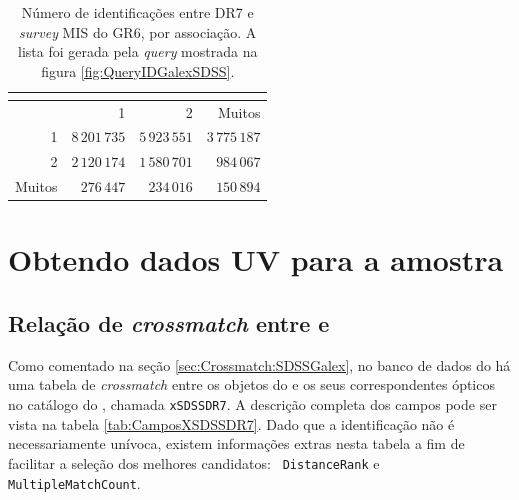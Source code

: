 \begin{table}
	\caption[Identificações entre \SDSS DR7 e {\em survey} AIS do \galex GR6.]
	{Número de identificações entre \SDSS DR7 e {\em survey} MIS do \galex GR6, por
	associação. A lista foi gerada pela {\em query} mostrada na figura
	\ref{fig:QueryIDGalexSDSS}.}
	\setlength{\tabcolsep}{1cm}
	\begin{tabular}{r r r r}
		\galex &         \multicolumn{3}{c}{\SDSS} \\
		\midrule
		       &             1 &             2 &        Muitos \\
		1      & $8\,201\,735$ & $5\,923\,551$ & $3\,775\,187$ \\
		2      & $2\,120\,174$ & $1\,580\,701$ &    $984\,067$ \\
		Muitos &    $276\,447$ &    $234\,016$ &    $150\,894$ \\
	\end{tabular}
	\label{tab:SDSSxGalexMatchesMIS}
\end{table}



\section{Obtendo dados UV para a amostra \STARLIGHT}
\label{sec:Crossmatch:DefAmostras}

\subsection{Relação de {\em crossmatch} entre \SDSS e \galex}
\label{sec:Crossmatch:DefAmostras:IdSDSSGalex}

Como comentado na seção \ref{sec:Crossmatch:SDSSGalex}, no banco de dados do
\galex há uma tabela de {\em crossmatch} entre os objetos do \galex e os seus
correspondentes ópticos no catálogo do \SDSS, chamada \texttt{xSDSSDR7}. A
descrição completa dos campos pode ser vista na tabela \ref{tab:CamposXSDSSDR7}.
Dado que a identificação não é necessariamente unívoca, existem informações
extras nesta tabela a fim de facilitar a seleção dos melhores candidatos: {\tt
DistanceRank} e \texttt{MultipleMatchCount}.

